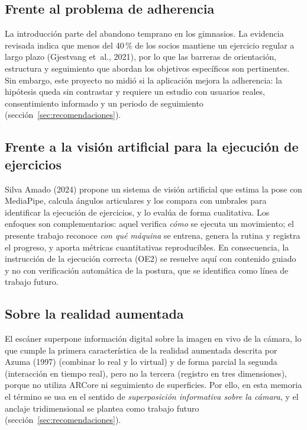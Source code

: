 \subsection{Frente al problema de adherencia}

La introducción parte del abandono temprano en los gimnasios. La evidencia
revisada indica que menos del 40\,\% de los socios mantiene un ejercicio regular
a largo plazo (Gjestvang et~al., 2021), por lo que las barreras de orientación,
estructura y seguimiento que abordan los objetivos específicos son pertinentes.
Sin embargo, este proyecto no midió si la aplicación mejora la adherencia: la
hipótesis queda sin contrastar y requiere un estudio con usuarios reales,
consentimiento informado y un periodo de seguimiento (sección~\ref{sec:recomendaciones}).

\subsection{Frente a la visión artificial para la ejecución de ejercicios}

Silva Amado (2024) propone un sistema de visión artificial que estima la pose
con MediaPipe, calcula ángulos articulares y los compara con umbrales para
identificar la ejecución de ejercicios, y lo evalúa de forma cualitativa. Los
enfoques son complementarios: aquel verifica \emph{cómo} se ejecuta un
movimiento; el presente trabajo reconoce \emph{con qué máquina} se entrena,
genera la rutina y registra el progreso, y aporta métricas cuantitativas
reproducibles. En consecuencia, la instrucción de la ejecución correcta (OE2)
se resuelve aquí con contenido guiado y no con verificación automática de la
postura, que se identifica como línea de trabajo futuro.

\subsection{Sobre la realidad aumentada}

El escáner superpone información digital sobre la imagen en vivo de la cámara,
lo que cumple la primera característica de la realidad aumentada descrita por
Azuma (1997) (combinar lo real y lo virtual) y de forma parcial la segunda
(interacción en tiempo real), pero no la tercera (registro en tres
dimensiones), porque no utiliza ARCore ni seguimiento de superficies. Por ello,
en esta memoria el término se usa en el sentido de \emph{superposición
informativa sobre la cámara}, y el anclaje tridimensional se plantea como
trabajo futuro (sección~\ref{sec:recomendaciones}).

